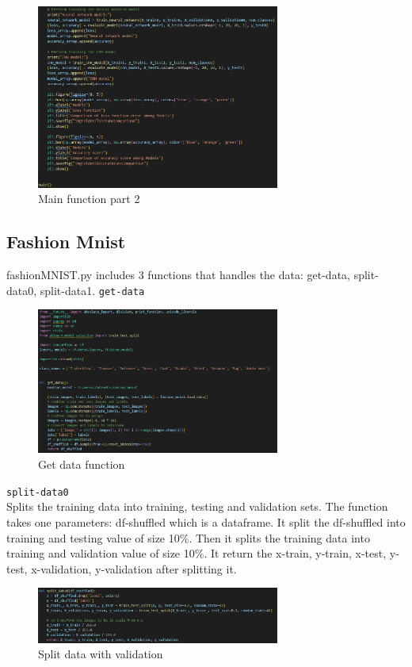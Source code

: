 \documentclass{article}
\newcommand{\code}[1]{\colorbox{light-gray}{\texttt{#1}}}
\begin{document}
\begin{figure}[H]
    \caption{Main function part 2}
    \centering
    \includegraphics[width=8cm]{../imgFolder/mainPart2.png}
\end{figure}

\subsection{Fashion Mnist}
fashionMNIST.py includes 3 functions that handles the data: get-data, split-data0, split-data1.
\code{get-data}\\\newline
\begin{figure}[H]
    \caption{Get data function}
    \centering
    \includegraphics[width=8cm]{../imgFolder/getData.png}
\end{figure}

\code{split-data0}\\
Splits the training data into training, testing and validation sets.
The function takes one parameters: df-shuffled which is a dataframe.
It split the df-shuffled into training and testing value of size 10\%.
Then it splits the training data into training and validation value of size 10\%.
It return the x-train, y-train, x-test, y-test, x-validation, y-validation after splitting it.

\begin{figure}[H]
    \caption{Split data with validation}
    \centering
    \includegraphics[width=8cm]{../imgFolder/splitData0.png}
\end{figure}
\end{document}
